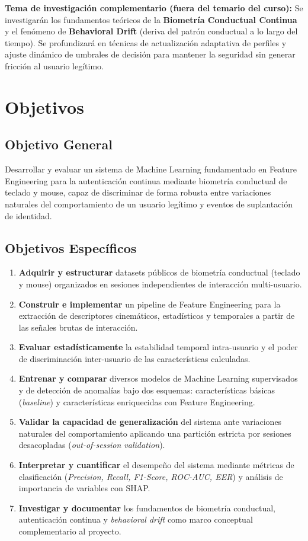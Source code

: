 \documentclass[10pt,letterpaper]{article}
\begin{document}
\textbf{Tema de investigación complementario (fuera del temario del curso):}
Se investigarán los fundamentos teóricos de la \textbf{Biometría Conductual Continua} y el fenómeno de \textbf{Behavioral Drift} (deriva del patrón conductual a lo largo del tiempo). Se profundizará en técnicas de actualización adaptativa de perfiles y ajuste dinámico de umbrales de decisión para mantener la seguridad sin generar fricción al usuario legítimo.

\section{Objetivos}

\subsection{Objetivo General}
Desarrollar y evaluar un sistema de Machine Learning fundamentado en Feature Engineering para la autenticación continua mediante biometría conductual de teclado y mouse, capaz de discriminar de forma robusta entre variaciones naturales del comportamiento de un usuario legítimo y eventos de suplantación de identidad.

\subsection{Objetivos Específicos}
\begin{enumerate}
    \item \textbf{Adquirir y estructurar} datasets públicos de biometría conductual (teclado y mouse) organizados en sesiones independientes de interacción multi-usuario.
    \item \textbf{Construir e implementar} un pipeline de Feature Engineering para la extracción de descriptores cinemáticos, estadísticos y temporales a partir de las señales brutas de interacción.
    \item \textbf{Evaluar estadísticamente} la estabilidad temporal intra-usuario y el poder de discriminación inter-usuario de las características calculadas.
    \item \textbf{Entrenar y comparar} diversos modelos de Machine Learning supervisados y de detección de anomalías bajo dos esquemas: características básicas (\textit{baseline}) y características enriquecidas con Feature Engineering.
    \item \textbf{Validar la capacidad de generalización} del sistema ante variaciones naturales del comportamiento aplicando una partición estricta por sesiones desacopladas (\textit{out-of-session validation}).
    \item \textbf{Interpretar y cuantificar} el desempeño del sistema mediante métricas de clasificación (\textit{Precision, Recall, F1-Score, ROC-AUC, EER}) y análisis de importancia de variables con SHAP.
    \item \textbf{Investigar y documentar} los fundamentos de biometría conductual, autenticación continua y \textit{behavioral drift} como marco conceptual complementario al proyecto.
\end{enumerate}
\end{document}
